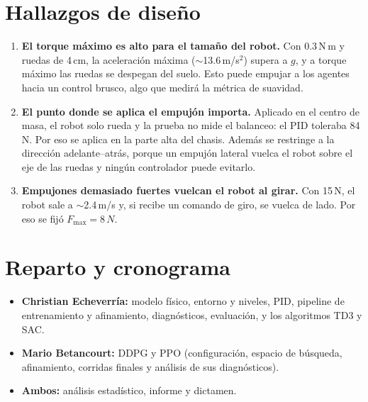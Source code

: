 \documentclass[11pt,a4paper]{article}
\newcommand{\SI}[2]{#1\,#2}  %
\begin{document}
\section{Hallazgos de diseño}

\begin{enumerate}
  \item \textbf{El torque máximo es alto para el tamaño del robot.} Con \SI{0.3}{N\,m} y ruedas de \SI{4}{cm}, la aceleración máxima ($\sim$\SI{13.6}{m/s$^2$}) supera a $g$, y a torque máximo las ruedas se despegan del suelo. Esto puede empujar a los agentes hacia un control brusco, algo que medirá la métrica de suavidad.
  \item \textbf{El punto donde se aplica el empujón importa.} Aplicado en el centro de masa, el robot solo rueda y la prueba no mide el balanceo: el PID toleraba \SI{84}{N}. Por eso se aplica en la parte alta del chasis. Además se restringe a la dirección adelante--atrás, porque un empujón lateral vuelca el robot sobre el eje de las ruedas y ningún controlador puede evitarlo.
  \item \textbf{Empujones demasiado fuertes vuelcan el robot al girar.} Con \SI{15}{N}, el robot sale a $\sim$\SI{2.4}{m/s} y, si recibe un comando de giro, se vuelca de lado. Por eso se fijó $F_\text{max}=\SI{8}{N}$.
\end{enumerate}

\section{Reparto y cronograma}

\begin{itemize}
  \item \textbf{Christian Echeverría:} modelo físico, entorno y niveles, PID, pipeline de entrenamiento y afinamiento, diagnósticos, evaluación, y los algoritmos TD3 y SAC.
  \item \textbf{Mario Betancourt:} DDPG y PPO (configuración, espacio de búsqueda, afinamiento, corridas finales y análisis de sus diagnósticos).
  \item \textbf{Ambos:} análisis estadístico, informe y dictamen.
\end{itemize}
\end{document}
